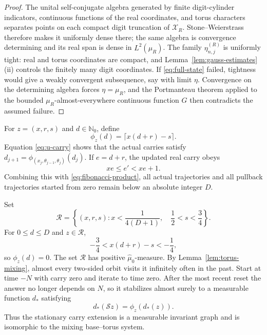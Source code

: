 \documentclass[11pt,a4paper]{amsart}
\theoremstyle{definition}
\theoremstyle{remark}
\newcommand{\N}{\mathbb N}
\begin{document}
\begin{proof}
The unital self-conjugate algebra generated by finite digit-cylinder
indicators, continuous functions of the real coordinates, and torus
characters separates points on each compact digit truncation of
$\mathcal X_R$.  Stone--Weierstrass therefore makes it uniformly dense there;
the same algebra is convergence determining and its real span is dense in
$L^2(\mu_R)$.  The family $\eta_{n,j}^{(R)}$ is uniformly tight: real and
torus coordinates are compact, and Lemma~\ref{lem:gauss-estimates}(ii)
controls the finitely many digit coordinates.  If \eqref{eq:full-state}
failed, tightness would give a weakly convergent subsequence, say with limit
$\eta$.  Convergence on the determining algebra forces $\eta=\mu_R$, and the
Portmanteau theorem applied to the bounded $\mu_R$-almost-everywhere
continuous function $G$ then contradicts the assumed failure.
\end{proof}

For $z=(x,r,s)$ and $d\in\N_0$, define
\begin{equation}\label{eq:carry-map}
 \phi_z(d)=\lceil x(d+r)-s\rceil.
\end{equation}
Equation \eqref{eq:u-carry} shows that the actual carries satisfy
$d_{j+1}=\phi_{(x_j,\theta_{j-1},\theta_j)}(d_j)$.
If $e=d+r$, the updated real carry obeys
\begin{equation}\label{eq:carry-contraction}
 xe\le e'<xe+1.
\end{equation}
Combining this with \eqref{eq:fibonacci-product}, all actual trajectories and
all pullback trajectories started from zero remain below an absolute integer
$D$.

Set
\begin{equation}\label{eq:reset-set}
 \mathcal R=\left\{(x,r,s):
 x<\frac1{4(D+1)},\quad\frac12<s<\frac34\right\}.
\end{equation}
For $0\le d\le D$ and $z\in\mathcal R$,
\[
 -\frac34<x(d+r)-s<-\frac14,
\]
so $\phi_z(d)=0$.  The set $\mathcal R$ has positive
$\widehat\mu_0$-measure.  By Lemma~\ref{lem:torus-mixing}, almost every
two-sided orbit visits it infinitely often in the past.  Start at time $-N$
with carry zero and iterate to time zero.  After the most recent reset the
answer no longer depends on $N$, so it stabilizes almost surely to a
measurable function $d_*$ satisfying
\begin{equation}\label{eq:carry-graph}
 d_*(\mathcal Sz)=\phi_z(d_*(z)).
\end{equation}
Thus the stationary carry extension is a measurable invariant graph and is
isomorphic to the mixing base--torus system.
\end{document}
